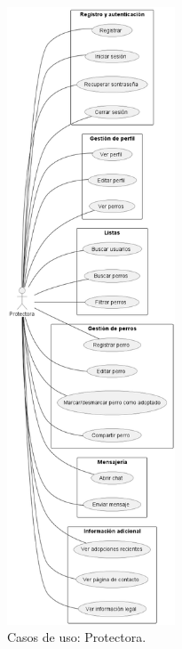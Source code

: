 \documentclass[a4paper, 12pt]{article}
\begin{document}
\begin{figure}[H]
	\begin{center}
		{\includegraphics[width=5cm]{diagram/Shelter.png}\par}
		\caption{Casos de uso: Protectora.}
	\end{center}
\end{figure}
\end{document}
